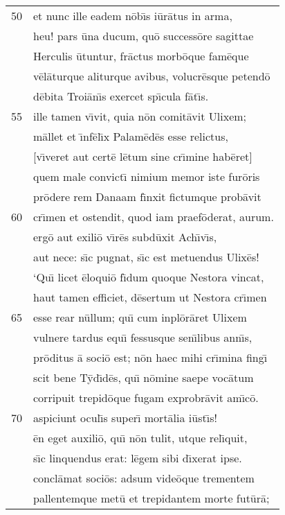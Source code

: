 \documentclass[paper=6in:9in,pagesize=pdftex,
               headinclude=on,footinclude=on,12pt]{scrbook}
\begin{document}
\begin{longtable}[p]{ r l }
50 & et nunc ille eadem n\=ob\={\i}s i\=ur\=atus in arma,\\ 
 & heu! pars \=una ducum, qu\=o success\=ore sagittae\\ 
 & Herculis \=utuntur, fr\=actus morb\=oque fam\=eque\\ 
 & v\=el\=aturque aliturque avibus, volucr\=esque petend\=o\\ 
 & d\=ebita Troi\=an\={\i}s exercet sp\={\i}cula f\=at\={\i}s.\\ 
55 & ille tamen v\={\i}vit, quia n\=on comit\=avit Ulixem;\\ 
 & m\=allet et \={\i}nf\=el\={\i}x Palam\=ed\=es esse relictus,\\ 
 & [v\={\i}veret aut cert\=e l\=etum sine cr\={\i}mine hab\=eret]\\ 
 & quem male convict\={\i} nimium memor iste fur\=oris\\ 
 & pr\=odere rem Danaam f\={\i}nxit fictumque prob\=avit\\ 
60 & cr\={\i}men et ostendit, quod iam praef\=oderat, aurum.\\ 
 & erg\=o aut exili\=o v\={\i}r\=es subd\=uxit Ach\={\i}v\={\i}s,\\ 
 & aut nece: s\={\i}c pugnat, s\={\i}c est metuendus Ulix\=es!\\ 
 & \indent `Qu\={\i} licet \=eloqui\=o f\={\i}dum quoque Nestora vincat,\\ 
 & haut tamen efficiet, d\=esertum ut Nestora cr\={\i}men\\ 
65 & esse rear n\=ullum; qu\={\i} cum inpl\=or\=aret Ulixem\\ 
 & vulnere tardus equ\={\i} fessusque sen\={\i}libus ann\={\i}s,\\ 
 & pr\=oditus \=a soci\=o est; n\=on haec mihi cr\={\i}mina fing\={\i}\\ 
 & scit bene T\=yd\={\i}d\=es, qu\={\i} n\=omine saepe voc\=atum\\ 
 & corripuit trepid\=oque fugam exprobr\=avit am\={\i}c\=o.\\ 
70 & aspiciunt ocul\={\i}s super\={\i} mort\=alia i\=ust\={\i}s!\\ 
 & \=en eget auxili\=o, qu\={\i} n\=on tulit, utque rel\={\i}quit,\\ 
 & s\={\i}c linquendus erat: l\=egem sibi d\={\i}xerat ipse.\\ 
 & concl\=amat soci\=os: adsum vide\=oque trementem\\ 
 & pallentemque met\=u et trepidantem morte fut\=ur\=a;\\ 

\end{longtable}
\end{document}
